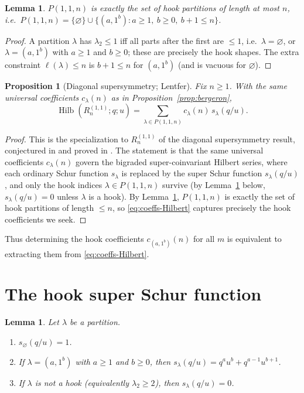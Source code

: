 \documentclass[11pt]{amsart}
\newtheorem{proposition}[theorem]{Proposition}
\newtheorem{lemma}[theorem]{Lemma}
\theoremstyle{definition}
\DeclareMathOperator{\Hilb}{Hilb}
\begin{document}
\begin{lemma}\label{lem:P11hooks}
$P(1,1,n)$ is exactly the set of hook partitions of length at most $n$, i.e.\
$P(1,1,n)=\{\varnothing\}\cup\{(a,1^b): a\ge1,\ b\ge0,\ b+1\le n\}$.
\end{lemma}

\begin{proof}
A partition $\lambda$ has $\lambda_2\le1$ iff all parts after the first are $\le1$,
i.e.\ $\lambda=\varnothing$, or $\lambda=(a,1^b)$ with $a\ge1$ and $b\ge0$; these
are precisely the hook shapes. The extra constraint $\ell(\lambda)\le n$ is
$b+1\le n$ for $(a,1^b)$ (and is vacuous for $\varnothing$).
\end{proof}

\begin{proposition}[Diagonal supersymmetry; Lentfer]\label{prop:ds}
Fix $n\ge1$. With the same universal coefficients $c_\lambda(n)$ as in
Proposition~\ref{prop:bergeron},
\begin{equation}\label{eq:coeffs-Hilbert}
\Hilb(R_n^{(1,1)}; q;u) = \sum_{\lambda \in P(1,1,n)}
c_{\lambda}(n)\, s_\lambda(q/u).
\end{equation}
\end{proposition}

\begin{proof}
This is the specialization to $R_n^{(1,1)}$ of the diagonal supersymmetry result,
conjectured in \cite{Bergeron2020} and proved in \cite{Lentfer-Supersymmetry}.
The statement is that the same universal coefficients $c_\lambda(n)$ govern the
bigraded super-coinvariant Hilbert series, where each ordinary Schur function
$s_\lambda$ is replaced by the super Schur function $s_\lambda(q/u)$, and only the
hook indices $\lambda\in P(1,1,n)$ survive (by Lemma~\ref{lem:schur-1-1} below,
$s_\lambda(q/u)=0$ unless $\lambda$ is a hook). By Lemma~\ref{lem:P11hooks},
$P(1,1,n)$ is exactly the set of hook partitions of length $\le n$, so
\eqref{eq:coeffs-Hilbert} captures precisely the hook coefficients we seek.
\end{proof}

Thus determining the hook coefficients $c_{(a,1^b)}(n)$ for all $m$ is equivalent
to extracting them from \eqref{eq:coeffs-Hilbert}.

\section{The hook super Schur function}\label{sec:superschur}

\begin{lemma}\label{lem:schur-1-1}
Let $\lambda$ be a partition.
\begin{enumerate}[\rm(i)]
\item $s_{\varnothing}(q/u)=1$.
\item If $\lambda=(a,1^b)$ with $a\ge1$ and $b\ge0$, then
$s_\lambda(q/u)= q^a u^b + q^{a-1}u^{b+1}$.
\item If $\lambda$ is not a hook (equivalently $\lambda_2\ge2$), then
$s_\lambda(q/u)=0$.
\end{enumerate}
\end{lemma}
\end{document}
